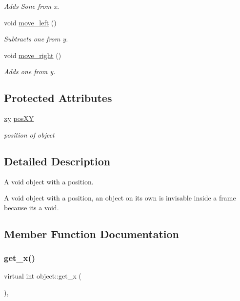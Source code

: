 \begin{DoxyCompactItemize}
\begin{DoxyCompactList}\small\item\em Adds Sone from x. \end{DoxyCompactList}\item 
void \hyperlink{classobject_a60b38349b8faad4c9e41f08df2c41428}{move\+\_\+left} ()
\begin{DoxyCompactList}\small\item\em Subtracts one from y. \end{DoxyCompactList}\item 
void \hyperlink{classobject_aeee28bb1b3f967e374c2878ddc4c57df}{move\+\_\+right} ()
\begin{DoxyCompactList}\small\item\em Adds one from y. \end{DoxyCompactList}\end{DoxyCompactItemize}
\subsection*{Protected Attributes}
\begin{DoxyCompactItemize}
\item 
\hyperlink{classxy}{xy} \hyperlink{classobject_a7fc771aa9781b84b7ee9d222c9bfa605}{pos\+XY}
\begin{DoxyCompactList}\small\item\em position of object \end{DoxyCompactList}\end{DoxyCompactItemize}


\subsection{Detailed Description}
A void object with a position. 

A void object with a position, an object on its own is invisable inside a frame because it\textquotesingle{}s a void. 

\subsection{Member Function Documentation}
\mbox{\label{classobject_a495a093671c8741380a292dd0bc757cb}} 
\subsubsection{\texorpdfstring{get\+\_\+x()}{get\_x()}}
{\footnotesize\ttfamily virtual int object\+::get\+\_\+x (\begin{DoxyParamCaption}{ }\end{DoxyParamCaption})\hspace{0.3cm}{\ttfamily [inline]}, {\ttfamily [virtual]}}



